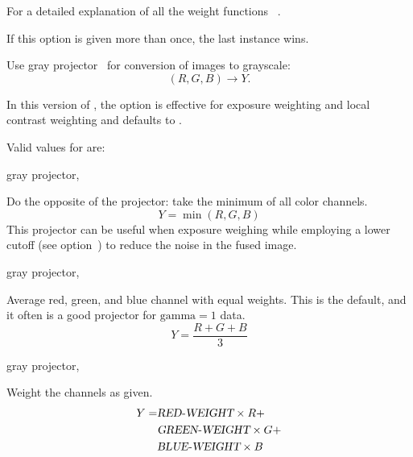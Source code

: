\begin{codelist}
\begin{table}[htbp]
    \caption[Exposure weight functions]{\label{tab:exposure-weight-functions}%
      Predefined exposure weight functions.  For a graphical comparison see
      \figureName~\ref{fig:exposure-weights}.}
  \end{table}

  For a detailed explanation of all the weight functions
  \sectionName~.

  If this option is given more than once, the last instance wins.


  \label{opt:gray-projector}%
\item[--gray-projector=\metavar{PROJECTOR}]\itemend
  Use gray projector~ for conversion of  images to grayscale:
  \[
  (R, G, B) \rightarrow Y.
  \]

  In this version of \App{}, the option is effective for exposure weighting and local contrast
  weighting and  defaults to .

  Valid values for  are:

  \begin{codelist}
           {gray projector, }%
  \item[anti-value]\itemend
    Do the opposite of the  projector: take the minimum of all color channels.
    \[
    Y = \min(R, G, B)
    \]
    This projector can be useful when exposure weighing while employing a lower cutoff (see
    option~) to reduce the noise in the fused image.

           {gray projector, }%
  \item[average]\itemend
    Average red, green, and blue channel with equal weights.  This is the default, and it often
    is a good projector for $\mbox{gamma} = 1$ data.
    \[
    Y = \frac{R + G + B}{3}
    \]

           {gray projector, }%
  \item[\itempar{channel-mixer:\metavar{RED-WEIGHT}:\feasiblebreak
    \metavar{GREEN-WEIGHT}:\feasiblebreak\metavar{BLUE-WEIGHT}}]\itemend
    Weight the channels as given.
    \begin{align*}
      Y = & \textsl{RED-WEIGHT} \times R  + \\
      & \textsl{GREEN-WEIGHT} \times G + \\
      & \textsl{BLUE-WEIGHT} \times B
    \end{align*}


\end{codelist}
\end{codelist}

